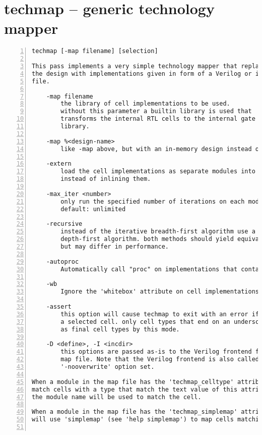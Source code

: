 \section{techmap -- generic technology mapper}
\label{cmd:techmap}
\begin{lstlisting}[numbers=left,frame=single]
    techmap [-map filename] [selection]

This pass implements a very simple technology mapper that replaces cells in
the design with implementations given in form of a Verilog or ilang source
file.

    -map filename
        the library of cell implementations to be used.
        without this parameter a builtin library is used that
        transforms the internal RTL cells to the internal gate
        library.

    -map %<design-name>
        like -map above, but with an in-memory design instead of a file.

    -extern
        load the cell implementations as separate modules into the design
        instead of inlining them.

    -max_iter <number>
        only run the specified number of iterations on each module.
        default: unlimited

    -recursive
        instead of the iterative breadth-first algorithm use a recursive
        depth-first algorithm. both methods should yield equivalent results,
        but may differ in performance.

    -autoproc
        Automatically call "proc" on implementations that contain processes.

    -wb
        Ignore the 'whitebox' attribute on cell implementations.

    -assert
        this option will cause techmap to exit with an error if it can't map
        a selected cell. only cell types that end on an underscore are accepted
        as final cell types by this mode.

    -D <define>, -I <incdir>
        this options are passed as-is to the Verilog frontend for loading the
        map file. Note that the Verilog frontend is also called with the
        '-nooverwrite' option set.

When a module in the map file has the 'techmap_celltype' attribute set, it will
match cells with a type that match the text value of this attribute. Otherwise
the module name will be used to match the cell.

When a module in the map file has the 'techmap_simplemap' attribute set, techmap
will use 'simplemap' (see 'help simplemap') to map cells matching the module.


\end{lstlisting}
